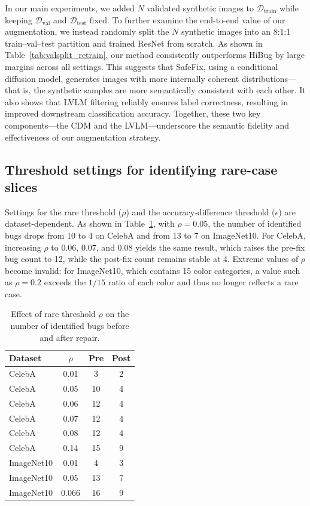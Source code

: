 \documentclass[10pt]{article} %
\newcommand{\model}{SafeFix\xspace}
\newcommand{\hibug}{HiBug\xspace}
\begin{document}
In our main experiments, we added $N$ validated synthetic images to $\mathcal{D}_{\mathrm{train}}$ while keeping $\mathcal{D}_{\mathrm{val}}$ and $\mathcal{D}_{\mathrm{test}}$ fixed. To further examine the end-to-end value of our augmentation, we instead randomly split the $N$ synthetic images into an 8:1:1 train--val--test partition and trained ResNet from scratch. As shown in Table~\ref{tab:valsplit_retrain}, our method consistently outperforms \hibug{} by large margins across all settings. This suggests that \model, using a conditional diffusion model, generates images with more internally coherent distributions—that is, the synthetic samples are more semantically consistent with each other. It also shows that LVLM filtering reliably ensures label correctness, resulting in improved downstream classification accuracy. Together, these two key components—the CDM and the LVLM—underscore the semantic fidelity and effectiveness of our augmentation strategy.




\subsection{Threshold settings for identifying rare-case slices}
\label{sec:threshold}

Settings for the rare threshold ($\rho$) and the accuracy-difference threshold ($\epsilon$) are dataset-dependent. As shown in Table~\ref{tab:rho_threshold}, with $\rho=0.05$, the number of identified bugs drops from 10 to 4 on CelebA and from 13 to 7 on ImageNet10. For CelebA, increasing \(\rho\) to 0.06, 0.07, and 0.08 yields the same result, which raises the pre-fix bug count to 12, while the post-fix count remains stable at 4. Extreme values of $\rho$ become invalid: for ImageNet10, which contains 15 color categories, a value such as $\rho=0.2$ exceeds the $1/15$ ratio of each color and thus no longer reflects a rare case.

\begin{table}[!t]
\centering
\small
\setlength{\tabcolsep}{6pt}
\renewcommand{\arraystretch}{0.95}
\caption{Effect of rare threshold $\rho$ on the number of identified bugs before and after repair.}
\label{tab:rho_threshold}
\begin{tabular}{lccc}
\toprule
\textbf{Dataset} & \boldmath$\rho$ & \textbf{Pre} & \textbf{Post} \\
\midrule
CelebA      & 0.01        & 3  & 2 \\
CelebA      & 0.05        & 10 & 4 \\
CelebA      & 0.06  & 12 & 4 \\
CelebA      & 0.07  & 12 & 4 \\
CelebA      & 0.08  & 12 & 4 \\
CelebA      & 0.14        & 15 & 9 \\
ImageNet10  & 0.01        & 4  & 3 \\
ImageNet10  & 0.05        & 13 & 7 \\
ImageNet10  & 0.066       & 16 & 9 \\
\bottomrule
\end{tabular}
\end{table}
\end{document}
